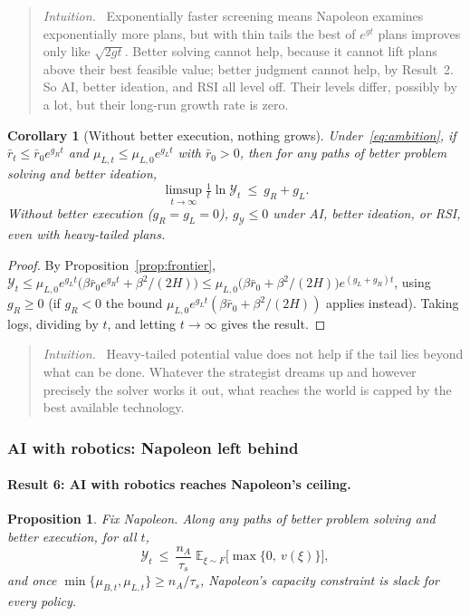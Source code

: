 \documentclass[11pt]{article}
\newcommand{\Nap}{\textcolor{nap}{Napoleon}}
\newtheorem{proposition}{Proposition}
\newtheorem{corollary}{Corollary}
\theoremstyle{remark}
\newenvironment{intuition}{\begin{quote}\small\color{muted}\textit{Intuition.}\ }{\end{quote}}
\newcommand{\E}{\mathbb{E}}
\newcommand{\Ycal}{\mathcal{Y}}
\begin{document}
\begin{intuition}
Exponentially faster screening means \Nap{} examines exponentially more plans, but with thin tails the best of $e^{gt}$ plans improves only like $\sqrt{2gt}$. Better solving cannot help, because it cannot lift plans above their best feasible value; better judgment cannot help, by Result~2. So AI, better ideation, and RSI all level off. Their levels differ, possibly by a lot, but their long-run growth rate is zero.
\end{intuition}

\begin{corollary}[Without better execution, nothing grows]\label{cor:frontier}
Under~\eqref{eq:ambition}, if $\bar r_t\le\bar r_0e^{g_Rt}$ and $\mu_{L,t}\le\mu_{L,0}e^{g_Lt}$ with $\bar r_0>0$, then for any paths of better problem solving and better ideation,
\[
\limsup_{t\to\infty}\tfrac1t\ln\Ycal_t\ \le\ g_R+g_L.
\]
Without better execution ($g_R=g_L=0$), $g_{\Ycal}\le0$ under AI, better ideation, or RSI, even with heavy-tailed plans.
\end{corollary}

\begin{proof}
By Proposition~\ref{prop:frontier}, $\Ycal_t\le\mu_{L,0}e^{g_Lt}\big(\beta\bar r_0e^{g_Rt}+\beta^2/(2H)\big)\le\mu_{L,0}\big(\beta\bar r_0+\beta^2/(2H)\big)e^{(g_L+g_R)t}$, using $g_R\ge0$ (if $g_R<0$ the bound $\mu_{L,0}e^{g_Lt}(\beta\bar r_0+\beta^2/(2H))$ applies instead). Taking logs, dividing by $t$, and letting $t\to\infty$ gives the result.
\end{proof}

\begin{intuition}
Heavy-tailed potential value does not help if the tail lies beyond what can be done. Whatever the strategist dreams up and however precisely the solver works it out, what reaches the world is capped by the best available technology.
\end{intuition}

\subsubsection{AI with robotics: \texorpdfstring{\Nap}{Napoleon} left behind}

\paragraph{Result 6: AI with robotics reaches \Nap's ceiling.}

\begin{proposition}\label{prop:airobotics}
Fix \Nap. Along any paths of better problem solving and better execution, for all $t$,
\[
\Ycal_t\ \le\ \frac{n_A}{\tau_s}\;\E_{\xi\sim F}\big[\max\{0,\ v(\xi)\}\big],
\]
and once $\min\{\mu_{B,t},\mu_{L,t}\}\ge n_A/\tau_s$, \Nap's capacity constraint is slack for every policy.
\end{proposition}
\end{document}
